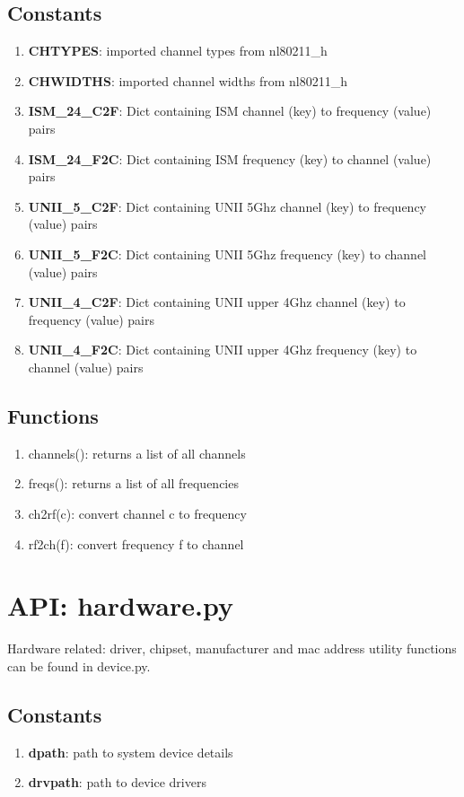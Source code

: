 \documentclass[11pt]{article}
\begin{document}
\begin{appendices}
\subsection{Constants}
\begin{enumerate}
\item \textbf{CHTYPES}: imported channel types from nl80211\_h
\item \textbf{CHWIDTHS}: imported channel widths from nl80211\_h
\item \textbf{ISM\_24\_C2F}: Dict containing ISM channel (key) to frequency (value) 
pairs
\item \textbf{ISM\_24\_F2C}: Dict containing ISM frequency (key) to channel (value)
pairs
\item \textbf{UNII\_5\_C2F}: Dict containing UNII 5Ghz channel (key) to frequency 
(value) pairs
\item \textbf{UNII\_5\_F2C}: Dict containing UNII 5Ghz frequency (key) to channel 
(value) pairs
\item \textbf{UNII\_4\_C2F}: Dict containing UNII upper 4Ghz channel (key) to 
frequency (value) pairs
\item \textbf{UNII\_4\_F2C}: Dict containing UNII upper 4Ghz frequency (key) to 
channel (value) pairs
\end{enumerate}

\subsection{Functions}
\begin{enumerate}
\item channels(): returns a list of all channels
\item freqs(): returns a list of all frequencies
\item ch2rf(c): convert channel c to frequency
\item rf2ch(f): convert frequency f to channel
\end{enumerate}

\section{API: hardware.py}\label{sec:hardwareapi}
Hardware related: driver, chipset, manufacturer and mac address utility functions 
can be found in device.py.

\subsection{Constants}
\begin{enumerate}
\item \textbf{dpath}: path to system device details
\item \textbf{drvpath}: path to device drivers 
\end{enumerate}


\end{appendices}
\end{document}
